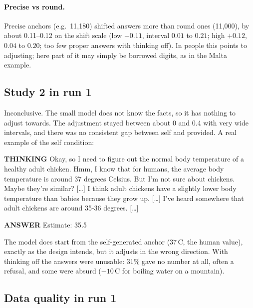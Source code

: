 \documentclass[11pt,a4paper]{article}
\newcommand{\who}[1]{\par\smallskip\noindent\textsf{\textbf{\footnotesize\MakeUppercase{#1}}}\quad}
\newcommand{\cut}{\textup{[\dots]}}
\begin{document}
\paragraph{Precise vs round.} Precise anchors (e.g.\ 11,180) shifted answers more than round ones (11,000), by about 0.11--0.12 on the shift scale (low $+0.11$, interval $0.01$ to $0.21$; high $+0.12$, $0.04$ to $0.20$; too few proper answers with thinking off). In people this points to adjusting; here part of it may simply be borrowed digits, as in the Malta example.

\subsection{Study 2 in run 1}

Inconclusive. The small model does not know the facts, so it has nothing to adjust towards. The adjustment stayed between about 0 and 0.4 with very wide intervals, and there was no consistent gap between self and provided. A real example of the self condition:

\begin{transcript}
\who{Thinking} Okay, so I need to figure out the normal body temperature of a healthy adult chicken. Hmm, I know that for humans, the average body temperature is around 37 degrees Celsius. But I'm not sure about chickens. Maybe they're similar? \cut{} I think adult chickens have a slightly lower body temperature than babies because they grow up. \cut{} I've heard somewhere that adult chickens are around 35-36 degrees. \cut{}
\who{Answer} Estimate: 35.5
\end{transcript}

\noindent The model does start from the self-generated anchor (37\,\textdegree C, the human value), exactly as the design intends, but it adjusts in the wrong direction. With thinking off the answers were unusable: 31\% gave no number at all, often a refusal, and some were absurd ($-10$\,\textdegree C for boiling water on a mountain).

\subsection{Data quality in run 1}
\end{document}
